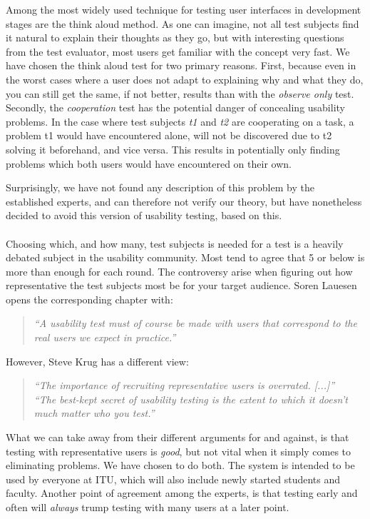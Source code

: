Among the most widely used technique for testing user interfaces in development stages are the think aloud method.\cite{steve} As one can imagine, not all test subjects find it natural to explain their thoughts as they go, but with interesting questions from the test evaluator, most users get familiar with the concept very fast. We have chosen the think aloud test for two primary reasons.
First, because even in the worst cases where a user does not adapt to explaining why and what they do, you can still get the same, if not better, results than with the \emph{observe only} test.
Secondly, the \emph{cooperation} test has the potential danger of concealing usability problems. In the case where test subjects \emph{t1} and \emph{t2} are cooperating on a task, a problem t1 would have encountered alone, will not be discovered due to t2 solving it beforehand, and vice versa. This results in potentially only finding problems which both users would have encountered on their own.

Surprisingly, we have not found any description of this problem by the established experts, and can therefore not verify our theory, but have nonetheless decided to avoid this version of usability testing, based on this. \\
\\
Choosing which, and how many, test subjects is needed for a test is a heavily debated subject in the usability community. Most tend to agree that 5 or below is more than enough for each round. The controversy arise when figuring out how representative the test subjects most be for your target audience. Soren Lauesen opens the corresponding chapter with: \cite{lauesen}
\begin{quotation}
\noindent \emph{``A usability test must of course be made with users that correspond to the real users we expect in practice.''}
\end{quotation}
However, Steve Krug has a different view: \cite{steve}
\begin{quotation}
\noindent \emph{``The importance of recruiting representative users is overrated. [...]''} \\
\noindent \emph{``The best-kept secret of usability testing is the extent to which it doesn't much matter who you test.''}
\end{quotation}

What we can take away from their different arguments for and against, is that testing with representative users is \emph{good}, but not vital when it simply comes to eliminating problems.
We have chosen to do both. The system is intended to be used by everyone at ITU, which will also include newly started students and faculty.
Another point of agreement among the experts, is that testing early and often will \emph{always} trump testing with many users at a later point. \cite{lauesen,steve,nielsen_five_users}

